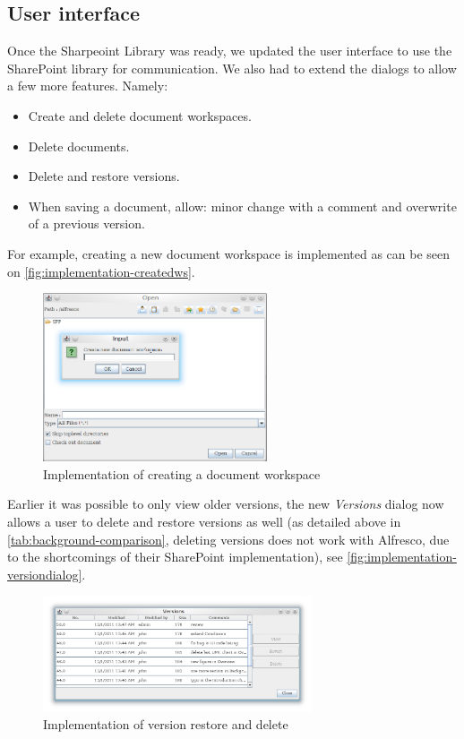 \subsection{User interface}

Once the Sharpeoint Library was ready, we updated the user interface to use the
SharePoint library for communication. We also had to extend the dialogs to allow
a few more features. Namely:

\begin{itemize}
\item Create and delete document workspaces.
\item Delete documents.
\item Delete and restore versions.
\item When saving a document, allow: minor change with a comment and overwrite of a previous version.
\end{itemize}

For example, creating a new document workspace is implemented as can be seen on
\autoref{fig:implementation-createdws}.

\begin{figure}[H]
\centering
\includegraphics[width=250px,keepaspectratio]{implementation-createdws.png}
\caption{Implementation of creating a document workspace}
\label{fig:implementation-createdws}
\end{figure}

Earlier it was possible to only view older versions, the new \emph{Versions}
dialog now allows a user to delete and restore versions as well (as detailed
above in \autoref{tab:background-comparison}, deleting versions does not work
with Alfresco, due to the shortcomings of their SharePoint implementation), see
\autoref{fig:implementation-versiondialog}.

\begin{figure}[H]
\centering
\includegraphics[width=300px,keepaspectratio]{implementation-versiondialog.png}
\caption{Implementation of version restore and delete}
\label{fig:implementation-versiondialog}
\end{figure}


